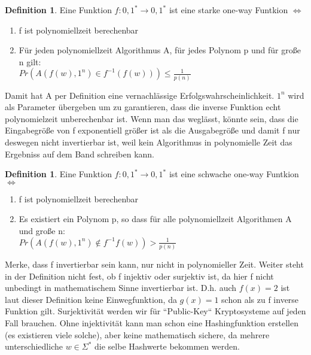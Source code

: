 \documentclass[12pt,a4paper]{article}
\theoremstyle{definition}
\newtheorem{definition}[theorem]{Definition}
\begin{document}
    \begin{definition}
        Eine Funktion $f: {0, 1}^* \longrightarrow {0, 1}^*$ ist eine starke one-way Funtkion $\Leftrightarrow$
        \begin{enumerate}
            \item f ist polynomiellzeit berechenbar
            \item Für jeden polynomiellzeit Algorithmus A, für jedes Polynom p und für große n gilt: \\
            $Pr(A(f(w), 1^n) \in f^{-1}(f(w))) \leq \frac{1}{p(n)}$
        \end{enumerate}

        Damit hat A per Definition eine vernachlässige Erfolgswahrscheinlichkeit. $1^n$ wird als Parameter übergeben um zu
        garantieren, dass die inverse Funktion echt polynomielzeit unberechenbar ist. Wenn man das weglässt, könnte sein,
        dass die Eingabegröße von f exponentiell größer ist als die Ausgabegröße und damit f nur deswegen nicht invertierbar
        ist, weil kein Algorithmus in polynomielle Zeit das Ergebniss auf dem Band schreiben kann.
    \end{definition}



    \begin{definition}
        Eine Funktion $f: {0, 1}^* \longrightarrow {0, 1}^*$ ist eine schwache one-way Funtkion $\Leftrightarrow$
        \begin{enumerate}
            \item f ist polynomiellzeit berechenbar
            \item Es existiert ein Polynom p, so dass für alle polynomiellzeit Algorithmen A und große n: \\
            $Pr(A(f(w), 1^n) \notin f^{-1}f(w)) > \frac{1}{p(n)}$
        \end{enumerate}

    \end{definition}

    Merke, dass f invertierbar sein kann, nur nicht in polynomieller Zeit. Weiter steht in der Definition nicht fest,
    ob f injektiv oder surjektiv ist, da hier f nicht unbedingt in mathematischem Sinne invertierbar ist. D.h. auch
    $f(x) = 2$ ist laut dieser Definition keine Einwegfunktion, da $g(x) = 1$ schon als zu f inverse Funktion gilt.
    Surjektivität werden wir für ``Public-Key`` Kryptosysteme auf jeden Fall brauchen. Ohne injektivität kann man schon
    eine Hashingfunktion erstellen (es existieren viele solche), aber keine mathematisch sichere, da mehrere
    unterschiedliche $w \in \Sigma^*$ die selbe Hashwerte bekommen werden.
\end{document}
